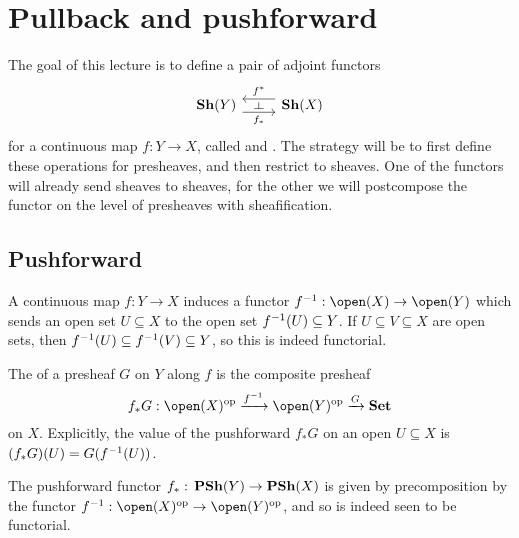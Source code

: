 \chapter{Pullback and pushforward}\label{lecture:5}

\noindent
The goal of this lecture is to define a pair of adjoint functors
\begin{equation*}
  \begin{tikzcd}
    \catSheaf(Y) \ar[r, "f_*"'{name=rightadj}, shift right=2] &
    \catSheaf(X) \ar[l, "f^*"'{name=leftadj}, shift right=2]
    \ar[from=leftadj, to=rightadj, phantom, "\leftadj" rotate=-90]
  \end{tikzcd}
\end{equation*}
for a continuous map \(f\colon Y\to X\), called  and .
The strategy will be to first define these operations for presheaves, and then restrict to sheaves.
One of the functors will already send sheaves to sheaves, for the other we will postcompose the functor on the level of presheaves with sheafification.

\section{Pushforward}

A continuous map \(f\colon Y\to X\) induces a functor \(f\inv\colon\open(X)\to\open(Y)\) which sends an open set \(U\subseteq X\) to the open set \(f^{-1}(U)\subseteq Y\).
If \(U\subseteq V\subseteq X\) are open sets, then \(f^{-1}(U)\subseteq f^{-1}(V)\subseteq Y\), so this is indeed functorial.

\begin{defn}
The  of a presheaf \(G\) on \(Y\) along \(f\) is the composite presheaf
\begin{equation*}
  f_*G \colon \open(X)\opp \xrightarrow{f\inv} \open(Y)\opp \xrightarrow{G} \catSet
\end{equation*}
on \(X\).
Explicitly, the value of the pushforward \(f_*G\) on an open \(U\subseteq X\) is \((f_*G)(U) = G(f^{-1}(U))\).
\end{defn}

The pushforward functor \(f_*\colon\catPresheaf(Y)\to\catPresheaf(X)\) is given by precomposition by the functor \(f\inv\colon\open(X)\opp\to\open(Y)\opp\), and so is indeed seen to be functorial.

